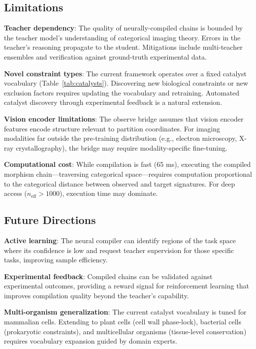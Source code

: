 \documentclass[11pt,twocolumn,a4paper]{article}
\theoremstyle{definition}
\theoremstyle{remark}
\begin{document}
\subsection{Limitations}

\textbf{Teacher dependency}: The quality of neurally-compiled chains is bounded by the teacher model's understanding of categorical imaging theory. Errors in the teacher's reasoning propagate to the student. Mitigations include multi-teacher ensembles and verification against ground-truth experimental data.

\textbf{Novel constraint types}: The current framework operates over a fixed catalyst vocabulary (Table~\ref{tab:catalysts}). Discovering new biological constraints or new exclusion factors requires updating the vocabulary and retraining. Automated catalyst discovery through experimental feedback is a natural extension.

\textbf{Vision encoder limitations}: The observe bridge assumes that vision encoder features encode structure relevant to partition coordinates. For imaging modalities far outside the pre-training distribution (e.g., electron microscopy, X-ray crystallography), the bridge may require modality-specific fine-tuning.

\textbf{Computational cost}: While compilation is fast (65 ms), executing the compiled morphism chain---traversing categorical space---requires computation proportional to the categorical distance between observed and target signatures. For deep access ($n_{\text{eff}} > 1000$), execution time may dominate.

\subsection{Future Directions}

\textbf{Active learning}: The neural compiler can identify regions of the task space where its confidence is low and request teacher supervision for those specific tasks, improving sample efficiency.

\textbf{Experimental feedback}: Compiled chains can be validated against experimental outcomes, providing a reward signal for reinforcement learning that improves compilation quality beyond the teacher's capability.

\textbf{Multi-organism generalization}: The current catalyst vocabulary is tuned for mammalian cells. Extending to plant cells (cell wall phase-lock), bacterial cells (prokaryotic constraints), and multicellular organisms (tissue-level conservation) requires vocabulary expansion guided by domain experts.
\end{document}

